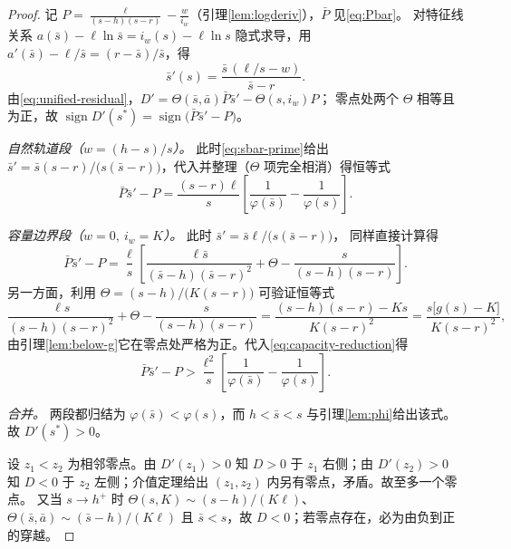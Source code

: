 \begin{proof}
记 $P=\frac{\ell}{(s-h)(s-r)}-\frac{w}{i_w}$（引理\ref{lem:logderiv}），$\bar P$ 见\eqref{eq:Pbar}。
对特征线关系 $a(\bar s)-\ell\ln\bar s=i_w(s)-\ell\ln s$ 隐式求导，用
$a'(\bar s)-\ell/\bar s=(r-\bar s)/\bar s$，得
\begin{equation}
\bar s'(s)=\frac{\bar s\,(\ell/s-w)}{\bar s-r}.
\label{eq:sbar-prime}
\end{equation}
由\eqref{eq:unified-residual}，$D'=\Theta(\bar s,\bar a)\bar P\bar s'-\Theta(s,i_w)P$；
零点处两个 $\Theta$ 相等且为正，故
$\operatorname{sign}D'(s^*)=\operatorname{sign}\bigl(\bar P\bar s'-P\bigr)$。

\emph{自然轨道段（$w=(h-s)/s$）。} 此时\eqref{eq:sbar-prime}给出
$\bar s'=\bar s(s-r)/\bigl(s(\bar s-r)\bigr)$，代入并整理（$\Theta$ 项完全相消）得恒等式
\begin{equation}
\bar P\bar s'-P=\frac{(s-r)\ell}{s}
\left[\frac1{\varphi(\bar s)}-\frac1{\varphi(s)}\right].
\label{eq:natural-reduction}
\end{equation}

\emph{容量边界段（$w=0,\ i_w=K$）。} 此时 $\bar s'=\bar s\ell/\bigl(s(\bar s-r)\bigr)$，
同样直接计算得
\begin{equation}
\bar P\bar s'-P=\frac{\ell}{s}
\left[\frac{\ell\bar s}{(\bar s-h)(\bar s-r)^2}+\Theta-\frac{s}{(s-h)(s-r)}\right].
\label{eq:capacity-reduction}
\end{equation}
另一方面，利用 $\Theta=(s-h)/\bigl(K(s-r)\bigr)$ 可验证恒等式
\begin{equation}
\frac{\ell s}{(s-h)(s-r)^2}+\Theta-\frac{s}{(s-h)(s-r)}
=\frac{(s-h)(s-r)-Ks}{K(s-r)^2}
=\frac{s\bigl[g(s)-K\bigr]}{K(s-r)^2},
\label{eq:capacity-slack}
\end{equation}
由引理\ref{lem:below-g}它在零点处严格为正。代入\eqref{eq:capacity-reduction}得
\[
\bar P\bar s'-P>\frac{\ell^2}{s}
\left[\frac1{\varphi(\bar s)}-\frac1{\varphi(s)}\right].
\]

\emph{合并。} 两段都归结为 $\varphi(\bar s)<\varphi(s)$，而 $h<\bar s<s$ 与引理\ref{lem:phi}给出该式。
故 $D'(s^*)>0$。

设 $z_1<z_2$ 为相邻零点。由 $D'(z_1)>0$ 知 $D>0$ 于 $z_1$ 右侧；由 $D'(z_2)>0$ 知 $D<0$ 于
$z_2$ 左侧；介值定理给出 $(z_1,z_2)$ 内另有零点，矛盾。故至多一个零点。
又当 $s\to h^+$ 时 $\Theta(s,K)\sim(s-h)/(K\ell)$、$\Theta(\bar s,\bar a)\sim(\bar s-h)/(K\ell)$
且 $\bar s<s$，故 $D<0$；若零点存在，必为由负到正的穿越。
\end{proof}

